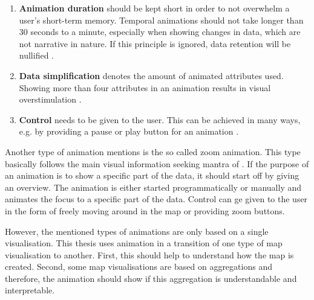 \begin{enumerate}

\item \textbf{Animation duration} should be kept short in order to not overwhelm a user's short-term memory. Temporal animations should not take longer than 30 seconds to a minute, especially when showing changes in data, which are not narrative in nature. If this principle is ignored, data retention will be nullified .

\item \textbf{Data simplification} denotes the amount of animated attributes used. Showing more than four attributes in an animation results in visual overstimulation .

\item \textbf{Control} needs to be given to the user. This can be achieved in many ways, e.g. by providing a pause or play button for an animation .

\end{enumerate}

Another type of animation \citeauthor{Muehlenhaus2014} mentions is the so called zoom animation. This type basically follows the main visual information seeking mantra of \citeauthor{Shneiderman1996}. If the purpose of an animation is to show a specific part of the data, it should start off by giving an overview. The animation is either started programmatically or manually and animates the focus to a specific part of the data. Control can ge given to the user in the form of freely moving around in the map or providing zoom buttons.

However, the mentioned types of animations are only based on a single visualisation. This thesis uses animation in a transition of one type of map visualisation to another. First, this should help to understand how the map is created. Second, some map visualisations are based on aggregations and therefore, the animation should show if this aggregation is understandable and interpretable.